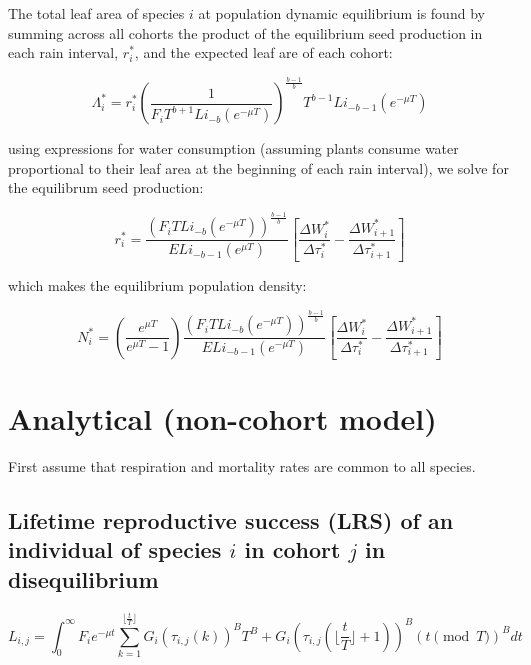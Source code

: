 \documentclass[11pt]{article}
\begin{document}
The total leaf area of species \(i\) at population dynamic equilibrium is found by summing across all cohorts the product of the equilibrium seed production in each rain interval, \(r_i^*\), and the expected leaf are of each cohort:

\begin{equation}
    \Lambda_i^* = r_i^*  \left( \frac{1}{F_i T^{b+1} Li_{-b}(e^{-\mu T})} \right)^{\frac{b-1}{b}} T^{b-1} Li_{-b-1}(e^{-\mu T})
\end{equation}

using expressions for water consumption (assuming plants consume water proportional to their leaf area at the beginning of each rain interval), we solve for the equilibrum seed production:

\begin{equation}
    r_i^* = \frac{\left(F_i T Li_{-b}(e^{-\mu T}) \right)^{\frac{b-1}{b}}}{E Li_{-b-1}(e^{\mu T})} \left[ \frac{\Delta W_i^*}{\Delta \tau_i^*} - \frac{\Delta W_{i+1}^*}{\Delta \tau_{i+1}^*} \right]
\end{equation}

which makes the equilibrium population density:

\begin{equation}
    N_i^* = \left(\frac{e^{\mu T}}{e^{\mu T} - 1}\right) \frac{\left(F_i T Li_{-b}(e^{-\mu T}) \right)^{\frac{b-1}{b}}}{E Li_{-b-1}(e^{-\mu T})} \left[ \frac{\Delta W_i^*}{\Delta \tau_i^*} - \frac{\Delta W_{i+1}^*}{\Delta \tau_{i+1}^*} \right]
\end{equation}


\section{Analytical (non-cohort model)}
\label{sec:org9272bbc}

First assume that respiration and mortality rates are common to all species.

\subsection{Lifetime reproductive success (LRS) of an individual of species \(i\) in cohort \(j\) in disequilibrium}
\label{sec:org83dd257}

\begin{equation}
    L_{i,j} = \int_0^\infty F_i e^{-\mu t} \sum_{k=1}^{\lfloor \frac{t}{T} \rfloor} G_i(\tau_{i,j}(k))^B T^B + G_i(\tau_{i,j}(\lfloor \frac{t}{T} \rfloor + 1))^B (t \pmod{T})^B dt
\end{equation}
\end{document}
